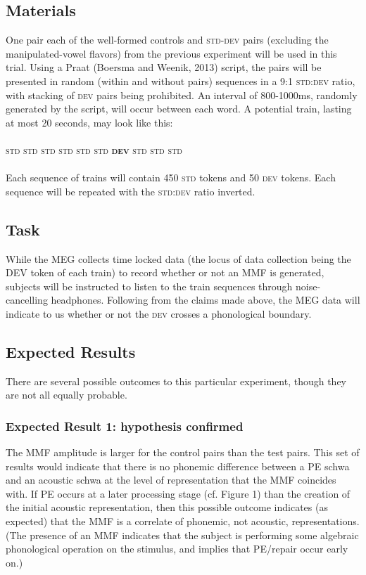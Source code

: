 \documentclass[jou,apacite]{apa6}
\begin{document}
    \subsection{Materials}
    One pair each of the well-formed controls and \textsc{std-dev} pairs (excluding the manipulated-vowel flavors) from the previous experiment will be used in this trial. Using a Praat (Boersma and Weenik, 2013) script, the pairs will be presented in random (within and without pairs) sequences in a 9:1 \textsc{std:dev} ratio, with stacking of \textsc{dev} pairs being prohibited. An interval of 800-1000ms, randomly generated by the script, will occur between each word. A potential train, lasting at most 20 seconds, may look like this:
    \\
    \\
    \textsc{std std std std std std \textbf{dev} std std std}
    \\
    \\
    Each sequence of trains will contain 450 \textsc{std} tokens and 50 \textsc{dev} tokens. Each sequence will be repeated with the \textsc{std:dev} ratio inverted.

    \subsection{Task}
    While the MEG collects time locked data (the locus of data collection being the DEV token of each train) to record whether or not an MMF is generated, subjects will be instructed to listen to the train sequences through noise-cancelling headphones. Following from the claims made above, the MEG data will indicate to us whether or not the \textsc{dev} crosses a phonological boundary.

    \subsection{Expected Results}
   There are several possible outcomes to this particular experiment, though they are not all equally probable.

        \subsubsection{Expected Result 1: hypothesis confirmed}
        The MMF amplitude is larger for the control pairs than the test pairs. This set of results would indicate that there is no phonemic difference between a PE schwa and an acoustic schwa at the level of representation that the MMF coincides with. If PE occurs at a later processing stage (cf. Figure 1) than the creation of the initial acoustic representation, then this possible outcome indicates (as expected) that the MMF is a correlate of phonemic, not acoustic, representations. (The presence of an MMF indicates that the subject is performing some algebraic phonological operation on the stimulus, and implies that PE/repair occur early on.)
\end{document}
